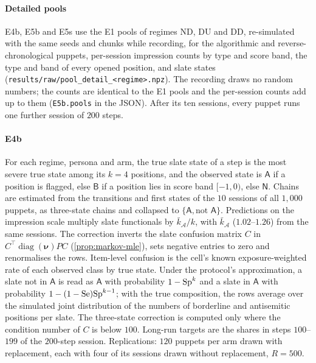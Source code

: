 \paragraph{Detailed pools} E4b, E5b and E5s use the E1 pools of regimes ND, DU and DD, re-simulated with the same seeds and chunks while recording, for the algorithmic and reverse-chronological puppets, per-session impression counts by type and score band, the type and band of every opened position, and slate states (\texttt{results/raw/pool\_detail\_<regime>.npz}). The recording draws no random numbers; the counts are identical to the E1 pools and the per-session counts add up to them (\texttt{E5b.pools} in the JSON). After its ten sessions, every puppet runs one further session of $200$ steps.

\paragraph{E4b} For each regime, persona and arm, the true slate state of a step is the most severe true state among its $k=4$ positions, and the observed state is $\mathsf A$ if a position is flagged, else $\mathsf B$ if a position lies in score band $[-1,0)$, else $\mathsf N$. Chains are estimated from the transitions and first states of the $10$ sessions of all $1{,}000$ puppets, as three-state chains and collapsed to $\{\mathsf A,\text{not }\mathsf A\}$. Predictions on the impression scale multiply slate functionals by $\bar k_{\mathcal A}/k$, with $\bar k_{\mathcal A}$ ($1.02$--$1.26$) from the same sessions. The correction inverts the slate confusion matrix $C$ in $C^{\top}\operatorname{diag}(\bm\nu)PC$ (\cref{prop:markov-mle}), sets negative entries to zero and renormalises the rows. Item-level confusion is the cell's known exposure-weighted rate of each observed class by true state. Under the protocol's approximation, a slate not in $\mathsf A$ is read as $\mathsf A$ with probability $1-\mathrm{Sp}^k$ and a slate in $\mathsf A$ with probability $1-(1-\mathrm{Se})\mathrm{Sp}^{k-1}$; with the true composition, the rows average over the simulated joint distribution of the numbers of borderline and antisemitic positions per slate. The three-state correction is computed only where the condition number of $C$ is below $100$. Long-run targets are the shares in steps $100$--$199$ of the $200$-step session. Replications: $120$ puppets per arm drawn with replacement, each with four of its sessions drawn without replacement, $R=500$.

